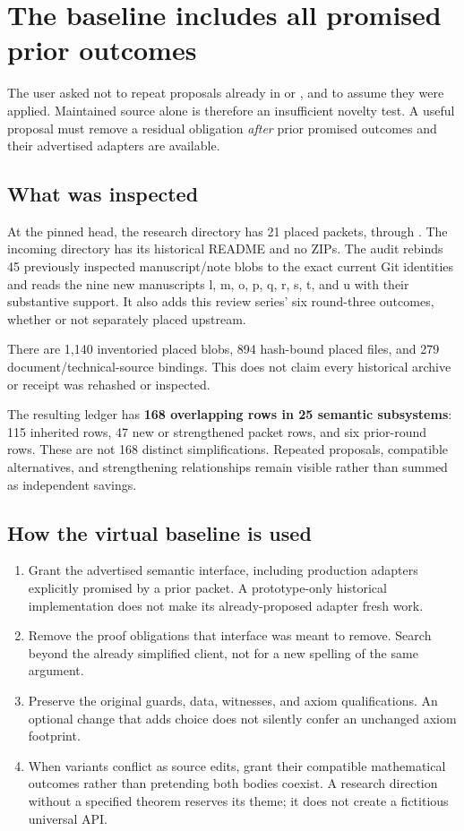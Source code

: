 \section{The baseline includes all promised prior outcomes}

The user asked not to repeat proposals already in  or , and to assume they were applied. Maintained source alone is therefore an insufficient novelty test. A useful proposal must remove a residual obligation \emph{after} prior promised outcomes and their advertised adapters are available.

\subsection{What was inspected}
At the pinned head, the research directory has 21 placed packets,  through . The incoming directory has its historical README and no ZIPs. The audit rebinds 45 previously inspected manuscript/note blobs to the exact current Git identities and reads the nine new manuscripts l, m, o, p, q, r, s, t, and u with their substantive support. It also adds this review series' six round-three outcomes, whether or not separately placed upstream.

There are 1,140 inventoried placed blobs, 894 hash-bound placed files, and 279 document/technical-source bindings. This does not claim every historical archive or receipt was rehashed or inspected.

The resulting ledger has \textbf{168 overlapping rows in 25 semantic subsystems}: 115 inherited rows, 47 new or strengthened packet rows, and six prior-round rows. These are not 168 distinct simplifications. Repeated proposals, compatible alternatives, and strengthening relationships remain visible rather than summed as independent savings.

\subsection{How the virtual baseline is used}
\begin{enumerate}
\item Grant the advertised semantic interface, including production adapters explicitly promised by a prior packet. A prototype-only historical implementation does not make its already-proposed adapter fresh work.
\item Remove the proof obligations that interface was meant to remove. Search beyond the already simplified client, not for a new spelling of the same argument.
\item Preserve the original guards, data, witnesses, and axiom qualifications. An optional change that adds choice does not silently confer an unchanged axiom footprint.
\item When variants conflict as source edits, grant their compatible mathematical outcomes rather than pretending both bodies coexist. A research direction without a specified theorem reserves its theme; it does not create a fictitious universal API.
\end{enumerate}

